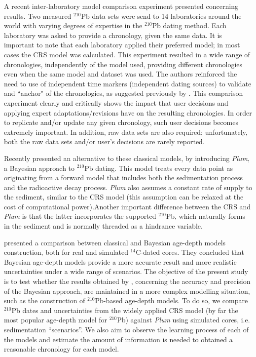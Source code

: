 \documentclass [10pt] {article}
\begin{document}
A recent inter-laboratory model comparison experiment \citep{Barsanti2020} presented concerning results.
Two measured $^{210}$Pb data sets were send to 14 laboratories around the world with varying degrees of expertise in the $^{210}$Pb dating method.
Each laboratory was asked to provide a chronology, given the same data. 
It is important to note that each laboratory applied their preferred model; in most cases the CRS model was calculated.
This experiment resulted in a wide range of chronologies, independently of the model used, providing different chronologies even when the same model and dataset was used.
The authors reinforced the need to use of independent time markers (independent dating sources) to validate and ``anchor" of the chronologies, as suggested previously by \citep{Smith2001}.  
This comparison experiment clearly and critically shows the impact that user decisions and applying expert adaptations/revisions have on the resulting chronologies.
In order to replicate and/or update any given chronology, such user decisions becomes extremely important.
In addition, raw data sets are also required; unfortunately, both the raw data sets and/or user's decisions are rarely reported.

Recently \citet{Aquino2018} presented an alternative to these classical models, by introducing \textit{Plum}, a Bayesian approach to $^{210}$Pb dating.
This model treats every data point as originating from a forward model that includes both the sedimentation process and the radioactive decay process.
\textit{Plum} also assumes a constant rate of supply to the sediment, similar to the CRS model (this assumption can be relaxed at the cost of computational power).Another important difference between the CRS and \textit{Plum} is that the latter incorporates the supported $^{210}$Pb, which naturally forms in the sediment and is normally threaded as a hindrance variable.

\citet{Blaauw2018} presented a comparison between classical and Bayesian age-depth models construction, both for real and simulated $^{14}$C-dated cores.
They concluded that Bayesian age-depth models provide a more accurate result and more realistic uncertainties under a wide range of scenarios.  
The objective of the present study is to test whether the results obtained by \citet{Blaauw2018}, concerning the accuracy and precision of the Bayesian approach, are maintained in a more complex modelling situation, such as the construction of $^{210}$Pb-based age-depth models.
To do so, we compare $^{210}$Pb dates and uncertainties from the widely applied CRS model (by far the most popular age-depth model for $^{210}$Pb) against \textit{Plum} using simulated cores, i.e. sedimentation ``scenarios''.
We also aim to observe the learning process of each of the models and estimate the amount of information is needed to obtained a reasonable chronology for each model. 
\end{document}
